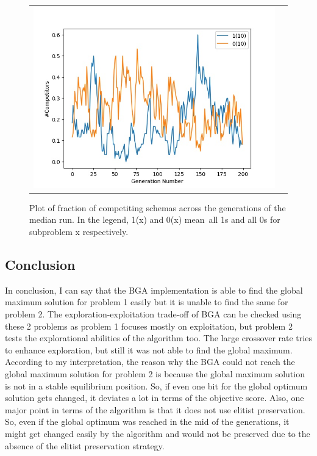 \documentclass{article}
\begin{document}
\begin{figure}[H]
\begin{adjustbox}{width=0.6\paperwidth}
\begin{tabular}{c c}
			\includegraphics{Codes/Problem_2 Construction_2/Comp_10.jpg}\\
		\end{tabular}
	\end{adjustbox}
	\caption{Plot of fraction of competiting schemas across the generations of the median run. In the legend, 1(x) and 0(x) mean\ all 1s and all 0s for subproblem x respectively.}
	\label{Prob_2_Const_2_Comp_Plot}
\end{figure}

\subsection{Conclusion}
In conclusion, I can say that the BGA implementation is able to find the global maximum solution for problem 1 easily but it is unable to find the same for problem 2. The exploration-exploitation trade-off of BGA can be checked using these 2 problems as problem 1 focuses mostly on exploitation, but problem 2 tests the explorational abilities of the algorithm too. The large crossover rate tries to enhance exploration, but still it was not able to find the global maximum.\\


According to my interpretation, the reason why the BGA could not reach the global maximum solution for problem 2 is because the global maximum solution is not in a stable equilibrium position. So, if even one bit for the global optimum solution gets changed, it deviates a lot in terms of the objective score. Also, one major point in terms of the algorithm is that it does not use elitist preservation. So, even if the global optimum was reached in the mid of the generations, it might get changed easily by the algorithm and would not be preserved due to the absence of the elitist preservation strategy.\\
\end{document}
